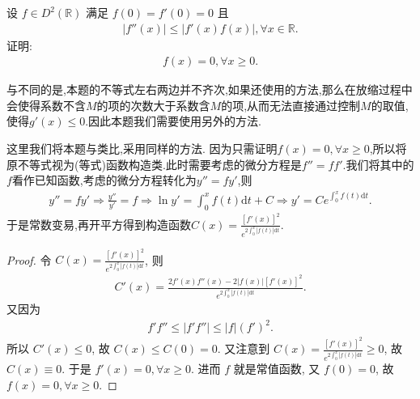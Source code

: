 \documentclass[../../main.tex]{subfiles}
\begin{document}
\begin{example}
设 $f\in D^2(\mathbb{R})$ 满足 $f(0)=f'(0)=0$ 且
\begin{align*}
|f''(x)|\leqslant|f'(x)f(x)|,\forall x\in\mathbb{R}.
\end{align*}
证明:
\begin{align*}
f(x)=0,\forall x\geqslant 0.
\end{align*} 
\end{example}
\begin{remark}
与不同的是,本题的不等式左右两边并不齐次,如果还使用的方法,那么在放缩过程中会使得系数不含$M$的项的次数大于系数含$M$的项,从而无法直接通过控制$M$的取值,使得$g'(x)\leqslant 0$.因此本题我们需要使用另外的方法.

这里我们将本题与类比,采用同样的方法. 因为只需证明$f(x)=0,\forall x\geqslant 0$,所以将原不等式视为(等式)函数构造类.此时需要考虑的微分方程是$f''=ff'$.我们将其中的$f$看作已知函数,考虑的微分方程转化为$y''=fy'$,则
\begin{align*}
y'' =fy' \Rightarrow \frac{y''}{y'}=f\Rightarrow \ln y' =\int_0^x{f\left( t \right) \mathrm{d}t}+C\Rightarrow y' =Ce^{\int_0^x{f\left( t \right) \mathrm{d}t}}.
\end{align*}
于是常数变易,再开平方得到构造函数$C\left( x \right) =\frac{\left[ f'\left( x \right) \right] ^2}{e^{2\int_0^x{|f\left( t \right)| \mathrm{d}t}}}.$
\end{remark}
\begin{proof}
令 $C(x)=\frac{[f'(x)]^2}{e^{2\int_0^x{|f(t)|\mathrm{d}t}}}$, 则
\begin{align*}
C'(x)=\frac{2f'(x)f''(x)-2|f(x)|[f'(x)]^2}{e^{2\int_0^x{|f(t)|\mathrm{d}t}}}.
\end{align*}
又因为
\begin{align*}
f'f''\leqslant|f'f''|\leqslant|f|(f')^2.
\end{align*}
所以 $C'(x)\leqslant0$, 故 $C(x)\leqslant C(0)=0$. 又注意到 $C(x)=\frac{[f'(x)]^2}{e^{2\int_0^x{|f(t)|\mathrm{d}t}}}\geqslant0$, 故 $C(x)\equiv0$. 于是 $f'(x)=0,\forall x\geqslant0$.
进而 $f$ 就是常值函数, 又 $f(0)=0$, 故 $f(x)=0,\forall x\geqslant0$. 

\end{proof}
\end{document}
